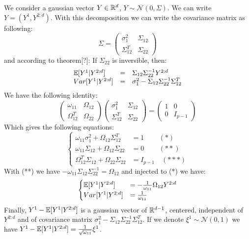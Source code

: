 We consider a gaussian vector $Y\in {\mathbb R}^d$, $Y \sim \mathcal N(0,\Sigma)$. We can write $Y=(Y^1,Y^{2:d})$. With this decomposition we can write the covariance matrix as following:
\begin{equation}
\Sigma=
 \begin{pmatrix}
\sigma_1^2 & \Sigma_{12}\\
\Sigma_{12}^T & \Sigma_{22}
\end{pmatrix}
\end{equation}
and according to theorem[?]: If $\Sigma_{22}$ is inversible, then:
\begin{equation}
\begin{array}{lcl}
{\mathbb E}[Y^1|Y^{2:d}]&=&\Sigma_{12}\Sigma_{22}^{-1}Y^{2:d}\\
Var[Y^1|Y^{2:d}]&=&\sigma_1^2-\Sigma_{12}\Sigma_{22}^{-1}\Sigma_{12}^T
\end{array}
\end{equation}
We have the following identity:
\begin{equation}
 \begin{pmatrix}
 \omega_{11}&\Omega_{12}\\
 \Omega_{12}^T&\Omega_{22}
\end{pmatrix}
 \begin{pmatrix}
 \sigma_{1}^2&\Sigma_{12}\\
 \Sigma_{12}^T&\Sigma_{22}
\end{pmatrix}
=
 \begin{pmatrix}
 1&0\\
0&I_{p-1}
\end{pmatrix}
\end{equation}
Which gives the following equations:
\begin{equation}
  \begin{cases}
  \omega_{11}\sigma_1^2+\Omega_{12}\Sigma_{12}^T&=1\quad\,\quad(*) \\
  \omega_{11}\Sigma_{12}+\Omega_{12}\Sigma_{22}&=0\quad\,\quad(**)\\
  \Omega_{12}^T\Sigma_{12}+\Omega_{22}\Sigma_{22}&=I_{p-1}\quad(***)
  \end{cases}
\end{equation}
With (**) we have $-\omega_{11}\Sigma_{12}\Sigma_{22}^{-1}=\Omega_{12}$ and injected to (*) we have:
\begin{equation}
 \begin{cases}
 {\mathbb E}[Y^1|Y^{2:d}]&=-\frac{1}{\omega_{11}}\Omega_{12}Y^{2:d}\\
  Var[Y^1|Y^{2:d}]&=\frac{1}{\omega_{11}}
  \end{cases}
\end{equation}
Finally, $Y^1-{\mathbb E}[Y^1|Y^{2:d}]$ is a gaussian vector of ${\mathbb R}^{d-1}$, centered, independent of $Y^{2:d}$ and of covariance matrix $\sigma_1^2-\Sigma_{12}\Sigma_{22}^{-1}\Sigma_{12}^T$. If we denote  $\xi^1\sim \mathcal N(0,1)$ we have $Y^1-{\mathbb E}[Y^1|Y^{2:d}]=\frac{1}{ \sqrt{\omega_{11}}}\xi^1$.\\

